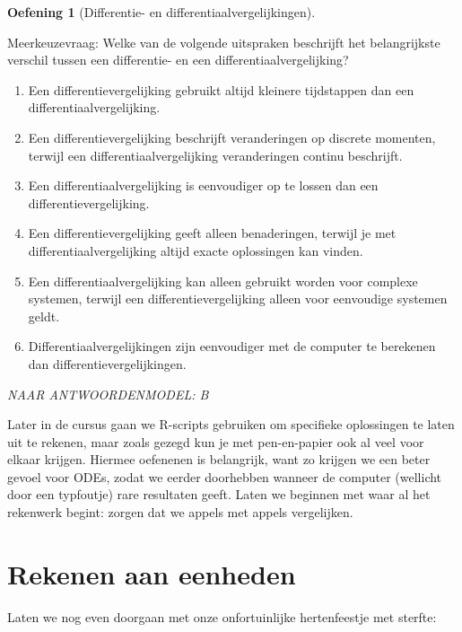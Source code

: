 \documentclass[
  a4paper,
]{scrbook}
\theoremstyle{definition}
\newtheorem{exercise}{Oefening}[chapter]
\theoremstyle{remark}
\begin{document}
\begin{exercise}[Differentie- en
differentiaalvergelijkingen]\protect\hypertarget{exr-diffvsdiff}{}\label{exr-diffvsdiff}

Meerkeuzevraag: Welke van de volgende uitspraken beschrijft het
belangrijkste verschil tussen een differentie- en een
differentiaalvergelijking?

\begin{enumerate}
\def\labelenumi{\Alph{enumi})}
\item
  Een differentievergelijking gebruikt altijd kleinere tijdstappen dan
  een differentiaalvergelijking.
\item
  Een differentievergelijking beschrijft veranderingen op discrete
  momenten, terwijl een differentiaalvergelijking veranderingen continu
  beschrijft.
\item
  Een differentiaalvergelijking is eenvoudiger op te lossen dan een
  differentievergelijking.
\item
  Een differentievergelijking geeft alleen benaderingen, terwijl je met
  differentiaalvergelijking altijd exacte oplossingen kan vinden.
\item
  Een differentiaalvergelijking kan alleen gebruikt worden voor complexe
  systemen, terwijl een differentievergelijking alleen voor eenvoudige
  systemen geldt.
\item
  Differentiaalvergelijkingen zijn eenvoudiger met de computer te
  berekenen dan differentievergelijkingen.
\end{enumerate}

\emph{NAAR ANTWOORDENMODEL: B}

\end{exercise}

Later in de cursus gaan we R-scripts gebruiken om specifieke oplossingen
te laten uit te rekenen, maar zoals gezegd kun je met pen-en-papier ook
al veel voor elkaar krijgen. Hiermee oefenenen is belangrijk, want zo
krijgen we een beter gevoel voor ODEs, zodat we eerder doorhebben
wanneer de computer (wellicht door een typfoutje) rare resultaten geeft.
Laten we beginnen met waar al het rekenwerk begint: zorgen dat we appels
met appels vergelijken.

\hypertarget{rekenen-aan-eenheden}{%
\section{Rekenen aan eenheden}\label{rekenen-aan-eenheden}}

Laten we nog even doorgaan met onze onfortuinlijke hertenfeestje met
sterfte:
\end{document}
